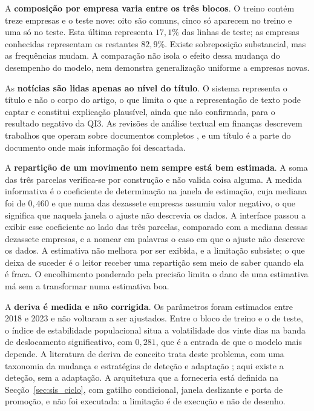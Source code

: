 A \textbf{composição por empresa varia entre os três blocos}. O treino contém treze empresas e
o teste nove: oito são comuns, cinco só aparecem no treino e uma só no teste. Esta última
representa $17{,}1\%$ das linhas de teste; as empresas conhecidas representam os restantes
$82{,}9\%$. Existe sobreposição substancial, mas as frequências mudam. A comparação não isola
o efeito dessa mudança do desempenho do modelo, nem demonstra generalização uniforme a empresas novas.

As \textbf{notícias são lidas apenas ao nível do título}. O sistema representa o título e não o
corpo do artigo, o que limita o que a representação de texto pode captar e constitui explicação
plausível, ainda que não confirmada, para o resultado negativo da \gls{QI}3. As revisões de análise
textual em finanças descrevem trabalhos que operam sobre documentos completos
\autocite{kearney2014textual}, e um título é a parte do documento onde mais informação foi
descartada.

A \textbf{repartição de um movimento nem sempre está bem estimada}. A soma das três parcelas
verifica-se por construção e não valida coisa alguma. A medida informativa é o coeficiente de
determinação na janela de estimação, cuja mediana foi de $0{,}460$ e que numa das dezassete empresas
assumiu valor negativo, o que significa que naquela janela o ajuste não descrevia os dados.
A interface passou a exibir esse coeficiente ao lado das três parcelas, comparado com a mediana
dessas dezassete empresas, e a nomear em palavras o caso em que o ajuste não descreve os dados. A estimativa
não melhora por ser exibida, e a limitação subsiste; o que deixa de suceder é o leitor receber
uma repartição sem meio de saber quando ela é fraca. O encolhimento ponderado pela precisão \autocite{vasicek1973beta} limita o dano de uma
estimativa má sem a transformar numa estimativa boa.

A \textbf{deriva é medida e não corrigida}. Os parâmetros foram estimados entre 2018 e 2023 e não
voltaram a ser ajustados. Entre o bloco de treino e o de teste, o índice de estabilidade
populacional situa a volatilidade dos vinte dias na banda de deslocamento significativo, com
$0{,}281$, que é a entrada de que o modelo mais depende. A literatura de deriva de conceito trata
deste problema, com uma taxonomia da mudança e estratégias de deteção e adaptação
\autocite{gama2014survey}; aqui existe a deteção, sem a adaptação. A arquitetura que a forneceria
está definida na Secção~\ref{sec:sis_ciclo}, com gatilho condicional, janela deslizante e porta de
promoção, e não foi executada: a limitação é de execução e não de desenho.

